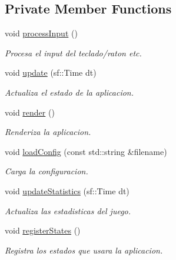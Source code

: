 \subsection*{Private Member Functions}
\begin{DoxyCompactItemize}
\item 
void \hyperlink{classant_1_1_application_ae16ecef2ce89b5c86bcade38e2566528}{process\+Input} ()
\begin{DoxyCompactList}\small\item\em Procesa el input del teclado/raton etc. \end{DoxyCompactList}\item 
void \hyperlink{classant_1_1_application_ae29763345c102458d5c4d478b116368b}{update} (sf\+::\+Time dt)
\begin{DoxyCompactList}\small\item\em Actualiza el estado de la aplicacion. \end{DoxyCompactList}\item 
void \hyperlink{classant_1_1_application_a3725d8c9b586e63892511da2d619492d}{render} ()
\begin{DoxyCompactList}\small\item\em Renderiza la aplicacion. \end{DoxyCompactList}\item 
void \hyperlink{classant_1_1_application_acb3fcc5ed9887411f25e3705bcebe735}{load\+Config} (const std\+::string \&filename)
\begin{DoxyCompactList}\small\item\em Carga la configuracion. \end{DoxyCompactList}\item 
void \hyperlink{classant_1_1_application_a46fc32ba7689d272e8fe7d8f917ddaff}{update\+Statistics} (sf\+::\+Time dt)
\begin{DoxyCompactList}\small\item\em Actualiza las estadisticas del juego. \end{DoxyCompactList}\item 
void \hyperlink{classant_1_1_application_a4a9143ee697efe0980056c6ed4a60e9d}{register\+States} ()
\begin{DoxyCompactList}\small\item\em Registra los estados que usara la aplicacion. \end{DoxyCompactList}\end{DoxyCompactItemize}
